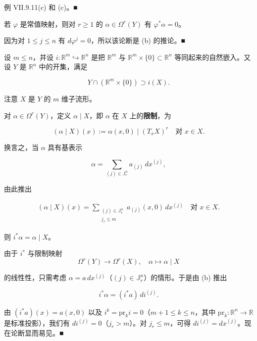 \begin{example}
\begin{items}
\proofhead
例 VII.9.11(c) 和 (c)。\nobreak\hspace{0.35em}■
\item

若 $ \varphi $ 是常值映射，则对 $ r \ge 1 $ 的 $ \alpha \in \Omega^{r}(Y) $ 有 $ \varphi^{*}\alpha = 0 $。

\proofhead
因为对 $ 1 \le j \le n $ 有 $ d\varphi^{j} = 0 $，所以该论断是 (b) 的推论。\nobreak\hspace{0.35em}■
\item

设 $ m \le n $，并设 $ i: \mathbb{R}^{m} \hookrightarrow \mathbb{R}^{n} $ 是把 $ \mathbb{R}^{m} $ 与 $ \mathbb{R}^{m} \times \{0\} \subset \mathbb{R}^{n} $ 等同起来的自然嵌入。又设 $ Y $ 是 $ \mathbb{R}^{n} $ 中的开集，满足

\[
Y \cap (\mathbb{R}^{m} \times \{0\}) \supset i(X).
\]

注意 $ X $ 是 $ Y $ 的 $ m $ 维子流形。

\end{items}


对 $ \alpha \in \Omega^{r}(Y) $，定义 $ \alpha \mid X $，即 $ \alpha $ 在 $ X $ 上的\textbf{限制}，为

\[
(\alpha \mid X)(x) := \alpha(x, 0) \mid (T_{x}X)^{r} \quad \text{对 } x \in X.
\]

换言之，当 $ \alpha $ 具有基表示

\[
\alpha = \sum_{(j) \in \mathbb{J}_{r}^{n}} a_{(j)}\,dx^{(j)},
\]

由此推出

\begin{equation*}
\begin{aligned}
(\alpha \mid X)(x) = \sum_{\substack{(j) \in \mathbb{J}_{r}^{n} \\ j_{r} \le m}} a_{(j)}(x, 0)\,dx^{(j)} \quad \text{对 } x \in X.
\end{aligned}
\end{equation*}

则 $ i^{*}\alpha = \alpha \mid X $。

\proofhead
由于 $ i^{*} $ 与限制映射
\[
\Omega^{r}(Y) \to \Omega^{r}(X), \quad \alpha \mapsto \alpha \mid X
\]

的线性性，只需考虑 $ \alpha = a\,dx^{(j)} $（$ (j) \in \mathbb{J}_{r}^{n} $）的情形。于是由 (b) 推出

\[
i^{*}\alpha = (i^{*}a)\,di^{(j)}.
\]

由 $ (i^{*}a)(x) = a(x, 0) $ 以及 $ i^{k} = \mathrm{pr}_{k}i = 0 $（$ m+1 \le k \le n $，其中 $ \mathrm{pr}_{k}: \mathbb{R}^{n} \to \mathbb{R} $ 是标准投影），我们有 $ di^{(j)} = 0 $（$ j_{r} > m $）。对 $ j_{r} \le m $，可得 $ di^{(j)} = dx^{(j)} $。现在论断显而易见。\nobreak\hspace{0.35em}■


\end{example}
